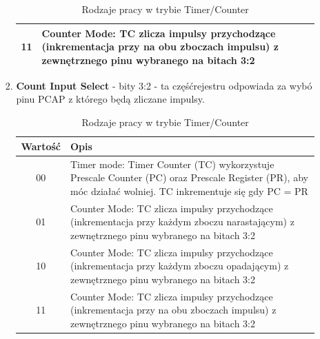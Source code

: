 \begin{enumerate}
\begin{enumerate}
\begin{enumerate}
\begin{table}[H]
\begin{tabular}{|c|p{13cm}|}
                    \hline
                    11 & Counter Mode: TC zlicza impulsy przychodzące (inkrementacja przy na obu zboczach impulsu) z zewnętrznego pinu wybranego na bitach 3:2  \\
                    \hline
                \end{tabular}
                \caption{Rodzaje pracy w trybie Timer/Counter}
            \end{table}
            \item \textbf{Count Input Select} - bity 3:2 - ta częśćrejestru odpowiada za wybó pinu PCAP z którego będą zliczane impulsy.\\
            \begin{table}[H]
                \centering
                \begin{tabular}{|c|p{13cm}|}
                    \hline
                    Wartość & Opis\\
                    \hline
                    00  & Timer mode: Timer Counter (TC) wykorzystuje Prescale Counter (PC) oraz Prescale Register (PR), aby móc działać wolniej. TC inkrementuje się gdy PC = PR\\
                    \hline
                    01 & Counter Mode: TC zlicza impulsy przychodzące (inkrementacja przy każdym zboczu narastającym) z zewnętrznego pinu wybranego na bitach 3:2  \\
                    \hline
                    10 & Counter Mode: TC zlicza impulsy przychodzące (inkrementacja przy każdym zboczu opadającym) z zewnętrznego pinu wybranego na bitach 3:2  \\
                    \hline
                    11 & Counter Mode: TC zlicza impulsy przychodzące (inkrementacja przy na obu zboczach impulsu) z zewnętrznego pinu wybranego na bitach 3:2  \\
                    \hline
                \end{tabular}
                \caption{Rodzaje pracy w trybie Timer/Counter}
            \end{table}
            

\end{enumerate}
\end{enumerate}
\end{enumerate}

